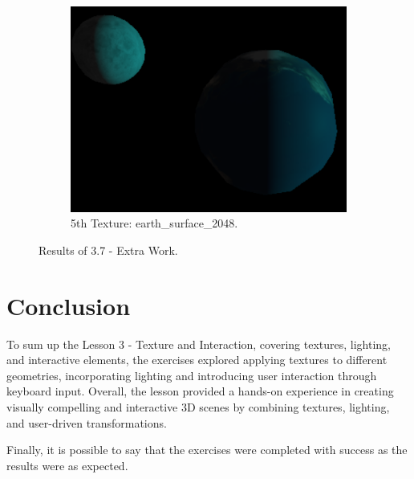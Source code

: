\documentclass[12pt]{article}
\begin{document}
\begin{figure}[!h]
\begin{subfigure}{.4\textwidth}
        \centering
        \includegraphics[width = \textwidth]{figs/ex_37_5_extra.png}
        \caption{5th Texture: earth\_surface\_2048.}
        \label{fig:ex_37_5_extra}
    \end{subfigure}
\caption{Results of 3.7 - Extra Work.}
\label{fig:ex_37_extra}
\end{figure}

\section*{Conclusion}
\label{Concl}

To sum up the Lesson 3 - Texture and Interaction, covering textures, lighting, and interactive elements, the exercises explored applying textures to different geometries, incorporating lighting and introducing user interaction through keyboard input. Overall, the lesson provided a hands-on experience in creating visually compelling and interactive 3D scenes by combining textures, lighting, and user-driven transformations.\par

Finally, it is possible to say that the exercises were completed with success as the results were as expected.

\end{document}
